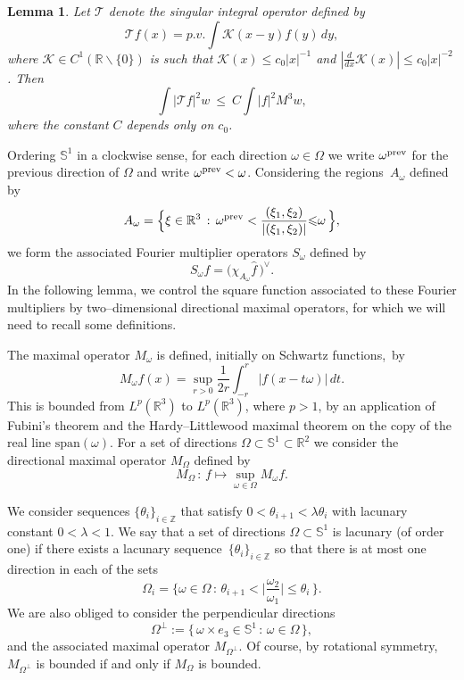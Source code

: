 \documentclass[11pt]{amsart}
\newtheorem{lemma}[theorem]{Lemma}
\theoremstyle{definition}
\theoremstyle{remark}
\begin{document}
\begin{lemma}\label{si} Let $\mathcal{T}$ denote the singular integral operator defined by
$$\mathcal{T}f(x)=p.v.\int \mathcal{K}(x-y) f(y)\, dy,$$
where $\mathcal{K}\in C^1(\mathbb{R}\backslash\{0\})$ is such that $\mathcal{K}(x){\leqslant} c_0|x|^{-1}$ and $|\frac{d}{dx}\mathcal{K}(x)|{\leqslant} c_0|x|^{-2}$. Then
$$
\int |\mathcal{T} f|^2 w\ {\leqslant} \ C\!\int |f|^2 M^3w,
$$
where the constant $C$ depends only on $c_0$.
\end{lemma}

Ordering $\mathbb{S}^1$ in a clockwise sense, for each direction
$\omega\in\Omega$ we write $\omega^{\rm prev}$ for the previous
direction of $\Omega$ and write $\omega^{\rm prev}<\omega$.
Considering the regions~$A_\omega$ defined by
$$
A_\omega=\Big\{ \xi\in \mathbb{R}^3\, :\, \omega^{\rm prev}<\frac{(\xi_1,\xi_2)}{|(\xi_1,\xi_2)|}{\leqslant}\omega\,\Big\},
$$
we form the associated Fourier multiplier operators $S_\omega$ defined by
$$
S_\omega f = \Big(\chi_{A_\omega} \widehat{f}\,\Big)^\vee.
$$
In the following lemma, we control the square function associated to these Fourier multipliers by two--dimensional directional maximal operators, for which we will need to recall some definitions.

The maximal operator $M_\omega$ is
 defined, initially on Schwartz functions,~by
$$
M_\omega f(x) =\sup_{r>0} \frac{1}{2r}\int_{-r}^r |f(x-t\omega)|\,dt.
$$
This is bounded from $L^p(\mathbb{R}^3)$ to $L^p(\mathbb{R}^3)$, where $p>1$, by an application of Fubini's theorem and the Hardy--Littlewood maximal theorem on the copy of the real line $\mathrm{span}(\omega)$. For a set of directions $\Omega\subset \mathbb{S}^1\subset \mathbb{R}^2$ we consider the directional maximal operator $M_\Omega$ defined by
$$
M_\Omega \,:\, f\mapsto \sup_{\omega\in\Omega}M_\omega f.
$$

We consider sequences $\{\theta_{i}\}_{i\in\mathbb{Z}}$ that satisfy
$ 0<\theta_{i+1}<{\lambda}\theta_i $ with lacunary constant $0<{\lambda}<1$. We
say that a set of directions $\Omega\subset \mathbb{S}^1$ is
lacunary (of order one) if there exists a lacunary
sequence~$\{\theta_{i}\}_{i\in\mathbb{Z}}$ so that there is at most
one direction in each of the sets
$$
\Omega_i=\Big\{ \omega \in \Omega\, :\, \theta_{i+1}<
\Big|\frac{\omega_2}{\omega_1}\Big|{\leqslant} \theta_i\,\Big\}.
$$
We are also obliged to consider the perpendicular directions
$$
\Omega^\perp:=\big\{ \,\omega\times e_3 \in\mathbb{S}^1\,:\, \omega\in\Omega\,\big\},
$$
and the associated maximal operator $M_{\Omega^\perp}$. Of course, by rotational symmetry, $M_{\Omega^\perp}$ is  bounded if and only if $M_\Omega$ is bounded.
\end{document}

